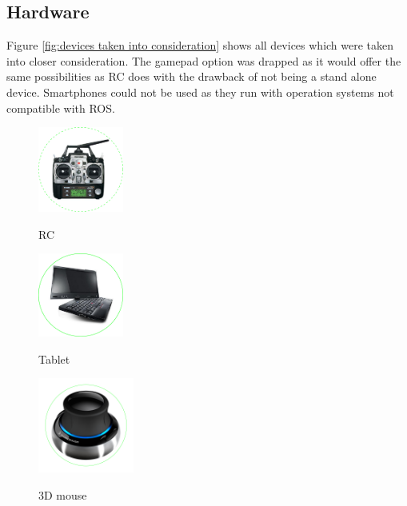 \subsection{Hardware}
\label{sub:hardware}

Figure \ref{fig:devices taken into consideration} shows all devices which were taken into closer consideration. The gamepad option was drapped as it would offer the same possibilities as RC does with the drawback of not being a stand alone device. Smartphones could not be used as they run with operation systems not compatible with \textsc{ROS}.

\begin{figure}[h]		
	\small{
		\begin{center}
			\parbox[b]{0.25\textwidth}{\includegraphics[width=0.25\textwidth]{futaba_7C_radio_encircled}
			\begin{center}RC \end{center}}
			\hspace{0.05\textwidth}
			\parbox[b]{0.25\textwidth}{\includegraphics[width=0.25\textwidth]{x220t_hero_encircled}
			\begin{center}Tablet \end{center}}
			\hspace{0.05 \textwidth}
			\parbox[b]{0.28\textwidth}{\includegraphics[width=0.28\textwidth]{3dx_productimage_encircled}
			\begin{center}3D mouse \end{center}}			

\end{center}}
\end{figure}
